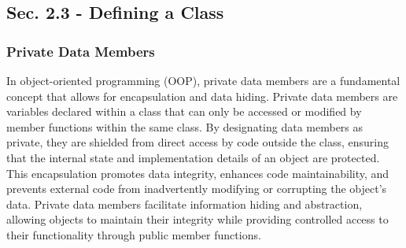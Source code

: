 \subsection*{Sec. 2.3 - Defining a Class}
\subsubsection*{Private Data Members}

In object-oriented programming (OOP), private data members are a fundamental concept that allows for encapsulation and data hiding. Private data members are variables declared within a class that can only be accessed or modified by member functions within the same class. 
By designating data members as private, they are shielded from direct access by code outside the class, ensuring that the internal state and implementation details of an object are protected. This encapsulation promotes data integrity, enhances code maintainability, and 
prevents external code from inadvertently modifying or corrupting the object's data. Private data members facilitate information hiding and abstraction, allowing objects to maintain their integrity while providing controlled access to their functionality through public 
member functions. \\

